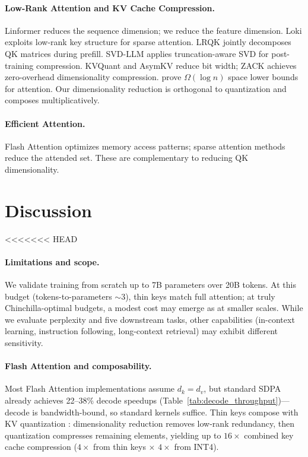\documentclass{article} %
\begin{document}
\paragraph{Low-Rank Attention and KV Cache Compression.}
Linformer \citep{wang2020linformer} reduces the sequence dimension; we reduce the feature dimension. Loki \citep{loki2024} exploits low-rank key structure for sparse attention. LRQK \citep{lrqk2025} jointly decomposes QK matrices during prefill. SVD-LLM \citep{svdllm2025} applies truncation-aware SVD for post-training compression. KVQuant \citep{kvquant2024} and AsymKV \citep{asymkv2024} reduce bit width; ZACK \citep{zack2025} achieves zero-overhead dimensionality compression. \citet{compressionbarriers2025} prove $\Omega(\log n)$ space lower bounds for attention. Our dimensionality reduction is orthogonal to quantization and composes multiplicatively.

\paragraph{Efficient Attention.}
Flash Attention \citep{dao2022flashattention, flashattention32024} optimizes memory access patterns; sparse attention methods \citep{child2019generating, beltagy2020longformer, saap2025} reduce the attended set. These are complementary to reducing QK dimensionality.


\section{Discussion}

<<<<<<< HEAD
\paragraph{Limitations and scope.}
We validate training from scratch up to 7B parameters over 20B tokens. At this budget (tokens-to-parameters $\sim$3), thin keys match full attention; at truly Chinchilla-optimal budgets, a modest cost may emerge as at smaller scales. While we evaluate perplexity and five downstream tasks, other capabilities (in-context learning, instruction following, long-context retrieval) may exhibit different sensitivity.

\paragraph{Flash Attention and composability.}
Most Flash Attention implementations assume $d_k = d_v$, but standard SDPA already achieves 22--38\% decode speedups (Table~\ref{tab:decode_throughput})---decode is bandwidth-bound, so standard kernels suffice. Thin keys compose with KV quantization \citep{liu2024kivi, kvquant2024, asymkv2024}: dimensionality reduction removes low-rank redundancy, then quantization compresses remaining elements, yielding up to $16\times$ combined key cache compression ($4\times$ from thin keys $\times$ $4\times$ from INT4).
\end{document}
